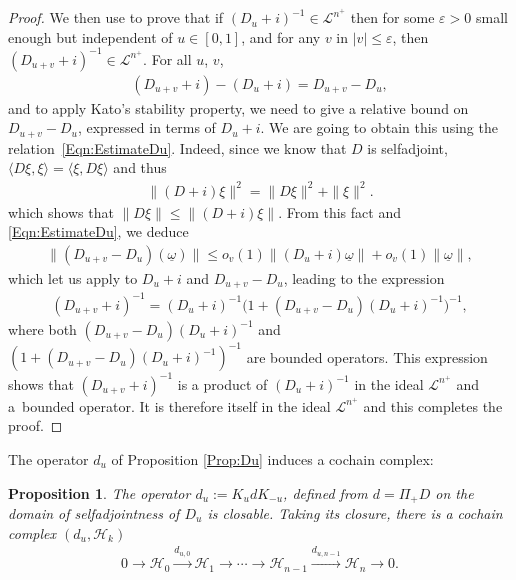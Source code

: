 \documentclass[pdftex]{sigma}
\newtheorem{Proposition}[Theorem]{Proposition}
 { \theoremstyle{definition}
\newtheorem{Definition}[Theorem]{Definition}
\newtheorem{Note}[Theorem]{Note}
\newtheorem{Example}[Theorem]{Example}
\newtheorem{Remark}[Theorem]{Remark} }
\newcommand{\Complex}[1][]{(d_{#1}, \Hh_k)}
\newcommand{\Hh}{\mathscr{H}}
\newcommand{\omegat}{\underline{\omega}}
\newcommand{\SymmIdeal}{\mathscr{L}}
\numberwithin{equation}{section}
\begin{document}
\begin{proof}
We then use \cite[Theorem~1.16, p.~196]{Kato} to prove that if $(D_u + i)^{-1} \in \SymmIdeal^{n^+}$ then for some $\varepsilon > 0$ small enough but independent of $u \in [0,1]$, and for any $v$ in $|v| \leqslant \varepsilon$, then $(D_{u+v} + i)^{-1} \in \SymmIdeal^{n^+}$. For all $u$, $v$,
\begin{gather*}
(D_{u+v} + i ) - (D_u + i) = D_{u+v} - D_u,
\end{gather*}
and to apply Kato's stability property, we need to give a relative bound on $D_{u+v} - D_u$, expressed in terms of $D_u +i$. We are going to obtain this using the relation~\eqref{Eqn:EstimateDu}. Indeed, since we know that $D$ is selfadjoint, $\langle D \xi, \xi \rangle = \langle \xi, D \xi \rangle $ and thus
\begin{gather*}
\| (D + i) \xi \|^2 = \| D \xi \|^2 + \| \xi \|^2.
\end{gather*}
which shows that $\| D \xi \| \leqslant \| (D + i) \xi \|$. From this fact and \eqref{Eqn:EstimateDu}, we deduce
\begin{gather*}
\| (D_{u+v} - D_u)(\omegat) \| \leqslant o_v(1) \| (D_u +i) \omegat \| + o_v(1) \| \omegat \|,
\end{gather*}
which let us apply \cite[Theorem~1.16, p.~196]{Kato} to $D_u +i$ and $D_{u+v} - D_u$, leading to the expression
\begin{gather*}
(D_{u+v} + i)^{-1} = (D_u + i)^{-1} \big(1 + (D_{u+v} - D_u)(D_u +i)^{-1}\big)^{-1},
\end{gather*}
where both $(D_{u+v} - D_u)(D_u +i)^{-1}$ and $(1 + (D_{u+v} - D_u)(D_u +i)^{-1})^{-1}$ are bounded operators. This expression shows that $(D_{u+v} + i)^{-1}$ is a product of $(D_u + i)^{-1}$ in the ideal $\SymmIdeal^{n^+}$ and a~bounded operator. It is therefore itself in the ideal $\SymmIdeal^{n^+}$ and this completes the proof.
\end{proof}

The operator $d_u$ of Proposition \ref{Prop:Du} induces a cochain complex:
\begin{Proposition}
The operator $d_u := K_u d K_{-u}$, defined from $d = \Pi_+ D$ on the domain of selfadjointness of $D_u$ is closable. Taking its closure, there is a cochain complex $\Complex[u]$
\begin{gather}
\label{Eqn:Complex}
0 \to \Hh_{0} \xrightarrow{d_{u,0}} \Hh_1 \to \cdots \to \Hh_{n-1} \xrightarrow{d_{u, n-1}} \Hh_n \to 0.
\end{gather}
\end{Proposition}
\end{document}

